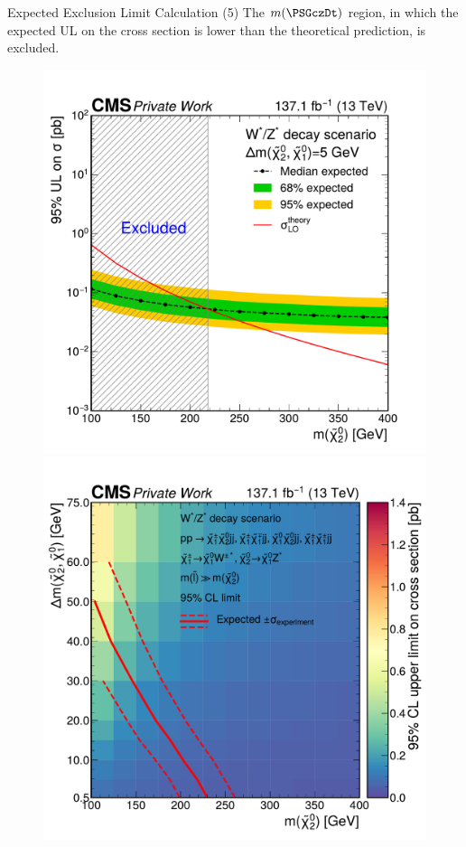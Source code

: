 \begin{frame}[fragile]{Expected Exclusion Limit Calculation (5)}
  The \(m(\PSGczDt)\) region, in which the expected UL on the cross section is lower than the theoretical prediction, is excluded.
  	\begin{figure}[htpb]
  	  \centering
  	  \includegraphics[height=0.48\textheight]{fig/limit-example/step-4.pdf}
  	  \includegraphics[height=0.48\textheight]{fig/exclusion-3d/Limit3D_wz.pdf}
  	\end{figure}
\end{frame}

